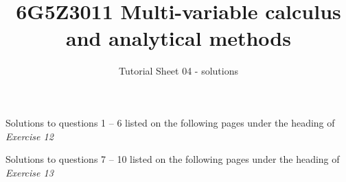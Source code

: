 \documentclass[a4paper]{amsart}
\begin{document}
\title{6G5Z3011 Multi-variable calculus and analytical methods}
\author{Tutorial Sheet 04 - solutions}
\maketitle

Solutions to questions 1 -- 6 listed on the following pages under the heading of \textit{Exercise 12}

Solutions to questions 7 -- 10 listed on the following pages under the heading of \textit{Exercise 13}



\end{document}
